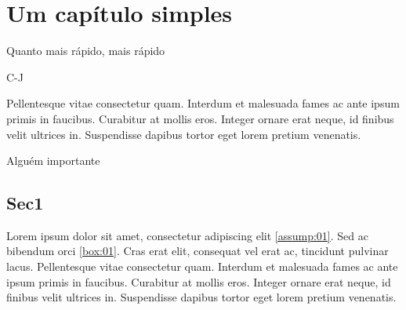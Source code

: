 \documentclass[./main.tex]{subfiles}
\begin{document}
\chapter{Um capítulo simples} \label{chap:2}

\epigraph{Quanto mais rápido, mais rápido}{C-J}

\epigraph{Pellentesque vitae consectetur quam. Interdum et malesuada fames ac ante ipsum primis in faucibus. Curabitur at mollis eros. Integer ornare erat neque, id finibus velit ultrices in. Suspendisse dapibus tortor eget lorem pretium venenatis.}{Alguém importante}

\section{Sec1} \label{chp2:sec1}

\par Lorem ipsum dolor sit amet, consectetur adipiscing elit \ref{assump:01}. Sed ac bibendum orci \ref{box:01}. Cras erat elit, consequat vel erat ac, tincidunt pulvinar lacus. Pellentesque vitae consectetur quam. Interdum et malesuada fames ac ante ipsum primis in faucibus. Curabitur at mollis eros. Integer ornare erat neque, id finibus velit ultrices in. Suspendisse dapibus tortor eget lorem pretium venenatis.
\end{document}
